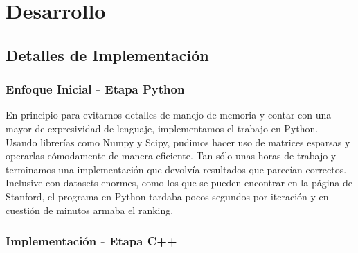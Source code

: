 \section{Desarrollo}

\subsection{Detalles de Implementación} %
\label{sub:detalles_de_implementaci_n}

\subsubsection{Enfoque Inicial - Etapa Python} %
\label{ssub:enfoque_inicial}

En principio para evitarnos detalles de manejo de memoria y contar con una mayor de expresividad de lenguaje, implementamos el trabajo en Python.\\

Usando librerías como Numpy y Scipy, pudimos hacer uso de matrices esparsas y operarlas cómodamente de manera eficiente. Tan sólo unas horas de trabajo y terminamos una implementación que devolvía resultados que parecían correctos. Inclusive con datasets enormes, como los que se pueden encontrar en la página de Stanford, el programa en Python tardaba pocos segundos por iteración y en cuestión de minutos armaba el ranking.\\

\subsubsection{Implementación - Etapa C++} %
\label{ssub:implementaci_n_etapa_c_}

